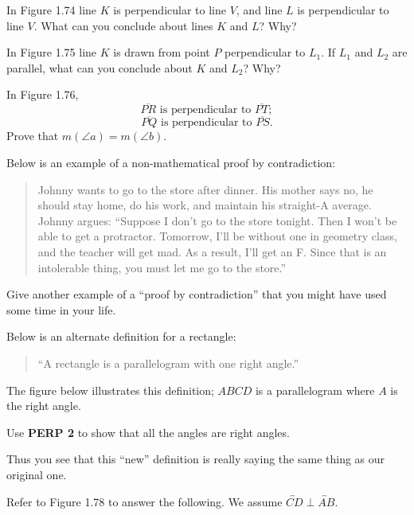 \documentclass[12pt]{book} %
\begin{document}
\begin{ExerciseList}
	\Exercise In Figure 1.74 line $K$ is perpendicular to line $V$, and line $L$ is perpendicular to line $V$. What can you conclude about lines $K$ and $L$? Why?
	
	
	\Exercise In Figure 1.75 line $K$ is drawn from point $P$ perpendicular to $L_1$. If $L_1$ and $L_2$ are parallel, what can you conclude about $K$ and $L_2$? Why?
	
	
	\Exercise In Figure 1.76,
	\[
	\overline{PR}\text{ is perpendicular to }\overline{PT};
	\]
	\[
	\overline{PQ}\text{ is perpendicular to }\overline{PS}.
	\]
	Prove that $m(\angle a)=m(\angle b)$.
	
	
	\Exercise Below is an example of a non-mathematical proof by contradiction:
	
	\begin{quote}
		Johnny wants to go to the store after dinner. His mother says no, he should stay home, do his work, and maintain his straight-A average. Johnny argues: ``Suppose I don't go to the store tonight. Then I won't be able to get a protractor. Tomorrow, I'll be without one in geometry class, and the teacher will get mad. As a result, I'll get an F. Since that is an intolerable thing, you must let me go to the store.''
	\end{quote}
	
	Give another example of a ``proof by contradiction'' that you might have used some time in your life.
	
	\Exercise Below is an alternate definition for a rectangle:
	
	\begin{quote}
		``A rectangle is a parallelogram with one right angle.''
	\end{quote}
	
	The figure below illustrates this definition; $ABCD$ is a parallelogram where $A$ is the right angle.
	
	
	Use \textbf{PERP 2} to show that all the angles are right angles.
	
	Thus you see that this ``new'' definition is really saying the same thing as our original one.


\Exercise Refer to Figure 1.78 to answer the following. We assume $\overleftrightarrow{CD}\perp \overleftrightarrow{AB}$.


\end{ExerciseList}
\end{document}
